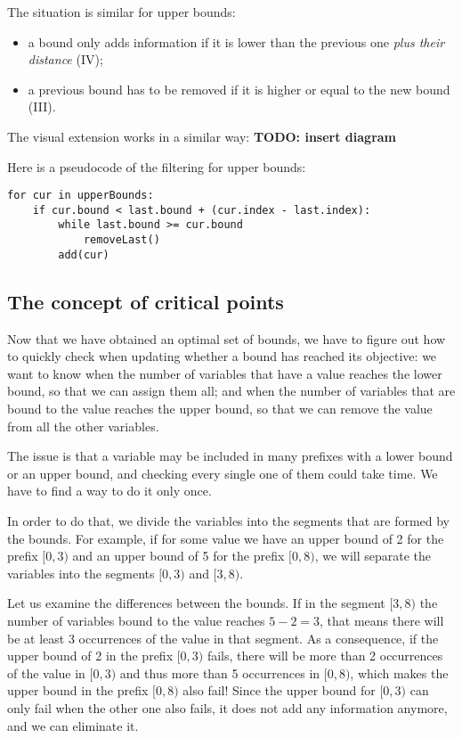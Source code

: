 \documentclass[a4paper,10pt]{article}
\begin{document}
The situation is similar for upper bounds:
\begin{itemize}
    \item a bound only adds information if it is lower than the previous one \emph{plus their distance} (IV);
    \item a previous bound has to be removed if it is higher or equal to the new bound (III).
\end{itemize}

The visual extension works in a similar way: \textbf{TODO: insert diagram}

Here is a pseudocode of the filtering for upper bounds:
\begin{lstlisting}
for cur in upperBounds:
    if cur.bound < last.bound + (cur.index - last.index):
        while last.bound >= cur.bound
            removeLast()
        add(cur)
\end{lstlisting}

\subsection{The concept of critical points}
\label{subsec:critical}

Now that we have obtained an optimal set of bounds, we have to figure out how to quickly check when updating whether a bound has reached its objective: we want to know when the number of variables that have a value reaches the lower bound, so that we can assign them all; and when the number of variables that are bound to the value reaches the upper bound, so that we can remove the value from all the other variables.

The issue is that a variable may be included in many prefixes with a lower bound or an upper bound, and checking every single one of them could take time. We have to find a way to do it only once.

In order to do that, we divide the variables into the segments that are formed by the bounds. For example, if for some value we have an upper bound of 2 for the prefix $[0,3)$ and an upper bound of 5 for the prefix $[0,8)$, we will separate the variables into the segments $[0,3)$ and $[3,8)$.

Let us examine the differences between the bounds. If in the segment $[3,8)$ the number of variables bound to the value reaches $5-2=3$, that means there will be at least 3 occurrences of the value in that segment. As a consequence, if the upper bound of 2 in the prefix $[0,3)$ fails, there will be more than 2 occurrences of the value in $[0,3)$ and thus more than 5 occurrences in $[0,8)$, which makes the upper bound in the prefix $[0,8)$ also fail! Since the upper bound for $[0,3)$ can only fail when the other one also fails, it does not add any information anymore, and we can eliminate it.
\end{document}
